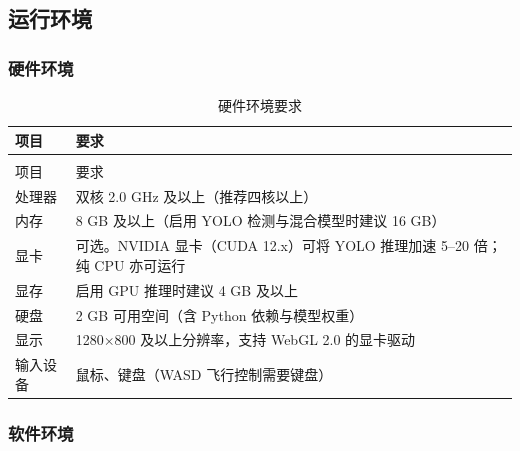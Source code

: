 \subsection{运行环境}

\subsubsection{硬件环境}

\begin{longtable}{@{}>{\heiti}p{3.2cm}p{10.8cm}@{}}
\caption{硬件环境要求}\label{tab:hardware}\\
\toprule
项目 & 要求 \\
\midrule
\endfirsthead
\multicolumn{1}{@{}l}{\small 续表~\thetable}\\
\toprule
项目 & 要求 \\
\midrule
\endhead
\bottomrule
\endlastfoot
处理器 & 双核 2.0 GHz 及以上（推荐四核以上） \\
内存 & 8 GB 及以上（启用 YOLO 检测与混合模型时建议 16 GB） \\
显卡 & 可选。NVIDIA 显卡（CUDA 12.x）可将 YOLO 推理加速 5--20 倍；纯 CPU 亦可运行 \\
显存 & 启用 GPU 推理时建议 4 GB 及以上 \\
硬盘 & 2 GB 可用空间（含 Python 依赖与模型权重） \\
显示 & 1280$\times$800 及以上分辨率，支持 WebGL 2.0 的显卡驱动 \\
输入设备 & 鼠标、键盘（WASD 飞行控制需要键盘） \\
\end{longtable}

\subsubsection{软件环境}

